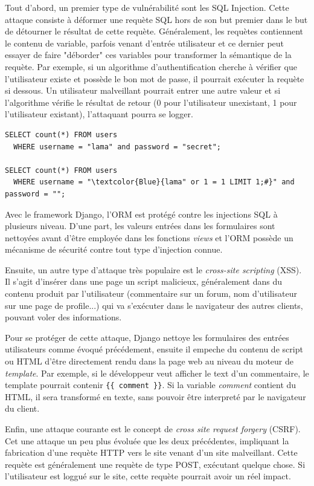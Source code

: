 \documentclass[a4paper,12pt]{article}
\begin{document}
Tout d'abord, un premier type de vulnérabilité sont les SQL Injection. Cette attaque
consiste à déformer une requète SQL hors de son but premier dans le but de détourner
le résultat de cette requète. Généralement, les requètes contiennent le contenu
de variable, parfois venant d'entrée utilisateur et ce dernier peut essayer
de faire "déborder" ces variables pour transformer la sémantique de la requète. Par
exemple, si un algorithme d'authentification cherche à vérifier que l'utilisateur existe
et possède le bon mot de passe, il pourrait exécuter la requète si dessous.
Un utilisateur malveillant pourrait entrer une autre valeur et si l'algorithme
vérifie le résultat de retour (0 pour l'utilisateur unexistant, 1 pour l'utilisateur
existant), l'attaquant pourra se logger.

\begin{Verbatim}
SELECT count(*) FROM users
  WHERE username = "lama" and password = "secret";

SELECT count(*) FROM users
  WHERE username = "\textcolor{Blue}{lama" or 1 = 1 LIMIT 1;#}" and password = "";
\end{Verbatim}

Avec le framework Django, l'ORM est protégé contre les injections SQL à plusieurs
niveau. D'une part, les valeurs entrées dans les formulaires sont nettoyées avant
d'être employée dans les fonctions \textit{views} et l'ORM possède un mécanisme
de sécurité contre tout type d'injection connue.

Ensuite, un autre type d'attaque très populaire est le \textit{cross-site scripting} (XSS).
Il s'agit d'insérer dans une page un script malicieux, généralement dans du contenu
produit par l'utilisateur (commentaire sur un forum, nom d'utilisateur sur une page de profile...)
qui va s'exécuter dans le navigateur des autres clients, pouvant voler des informations.

Pour se protéger de cette attaque, Django nettoye les formulaires des entrées utilisateurs
comme évoqué précédement, ensuite il empeche du contenu de script ou HTML d'être directement
rendu dans la page web au niveau du moteur de \textit{template}. Par exemple,
si le développeur veut afficher le text d'un commentaire, le template pourrait contenir
\texttt{\{\{ comment \}\}}. Si la variable \textit{comment} contient du HTML,
il sera transformé en texte, sans pouvoir être interpreté par le navigateur du client.

Enfin, une attaque courante est le concept de \textit{cross site request forgery} (CSRF).
Cet une attaque un peu plus évoluée que les deux précédentes, impliquant la fabrication
d'une requète HTTP vers le site venant d'un site malveillant. Cette requète est généralement
une requète de type POST, exécutant quelque chose. Si l'utilisateur est loggué sur le site,
cette requète pourrait avoir un réel impact.
\end{document}
